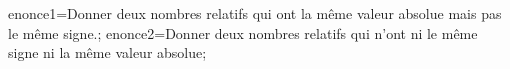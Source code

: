 \documentclass[exercice]{thedocument}%
\begin{document}
%
    \>enonce1=Donner deux nombres relatifs qui ont la même valeur absolue mais pas
    le même signe.;
    \>enonce2=Donner deux nombres relatifs qui n'ont ni le même signe ni la
    même valeur absolue;
\end{document}
